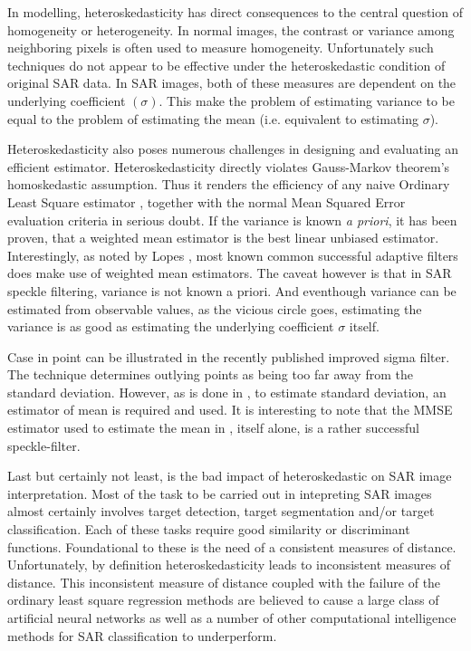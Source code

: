 \documentclass[journal]{IEEEtran}
\begin{document}
In modelling, heteroskedasticity has direct consequences to the central question of homogeneity or heterogeneity. 
In normal images, the contrast or variance among neighboring pixels is often used to measure homogeneity. 
Unfortunately such techniques do not appear to be effective under the heteroskedastic condition of original SAR data. 
In SAR images, both of these measures are dependent on the underlying coefficient $(\sigma)$. 
This make the problem of estimating variance to be equal to the problem of estimating the mean (i.e. equivalent to estimating $\sigma$).

Heteroskedasticity also poses numerous challenges in designing and evaluating an efficient estimator. 
Heteroskedasticity directly violates Gauss-Markov theorem's homoskedastic assumption. 
Thus it renders the efficiency of any naive Ordinary Least Square estimator \cite{Furno_1991_JStatCompSimul}, together with the normal Mean Squared Error evaluation criteria in serious doubt. 
If the variance is known \textit{a priori}, it has been proven, that a weighted mean estimator is the best linear unbiased estimator. 
Interestingly, as noted by Lopes \cite{Lopes_TGRS_1990}, most known common successful adaptive filters \cite{Lee_PAMI_1980} \cite{Kuan_1985_PAMI} \cite{Frost_PAMI_1982} does make use of weighted mean estimators. 
The caveat however is that in SAR speckle filtering, variance is not known a priori. 
And eventhough variance can be estimated from observable values, as the vicious circle goes, estimating the variance is as good as estimating the underlying coefficient $\sigma$ itself.

Case in point can be illustrated in the recently published improved sigma filter\cite{Lee_TGRS_2009}. 
The technique determines outlying points as being too far away from the standard deviation. 
However, as is done in \cite{Lee_TGRS_2009}, to estimate standard deviation, an estimator of mean is required and used. 
It is interesting to note that the MMSE estimator used to estimate the mean in \cite{Lee_TGRS_2009}, itself alone, is a rather successful speckle-filter\cite{Lee_PAMI_1980}.

Last but certainly not least, is the bad impact of heteroskedastic on SAR image interpretation. 
Most of the task to be carried out in intepreting SAR images almost certainly involves target detection, target segmentation and/or target classification. 
Each of these tasks require good similarity or discriminant functions. 
Foundational to these is the need of a consistent measures of distance. 
Unfortunately, by definition heteroskedasticity leads to inconsistent measures of distance. 
This inconsistent measure of distance coupled with the failure of the ordinary least square regression methods are believed to cause a large class of artificial neural networks as well as a number of other computational intelligence methods for SAR classification to underperform.
\end{document}
